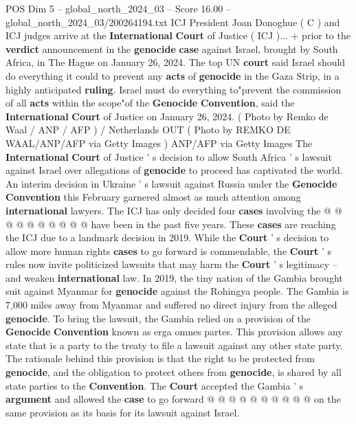 \begin{textsample}{POS Dim 5 – global\_north\_2024\_03 – Score 16.00 – global\_north\_2024\_03/200264194.txt}  \label{ex:f5_pos_362}
ICJ President Joan Donoghue ( C ) and ICJ judges arrive at the \textbf{International} \textbf{Court} of Justice ( ICJ )... + prior to the \textbf{verdict} announcement in the \textbf{genocide} \textbf{case} against Israel, brought by South Africa, in The Hague on January 26, 2024.
The top UN \textbf{court} said Israel should do everything it could to prevent any \textbf{acts} of \textbf{genocide} in the Gaza Strip, in a highly anticipated \textbf{ruling}.
Israel must do everything to"prevent the commission of all \textbf{acts} within the scope"of the \textbf{Genocide} \textbf{Convention}, said the \textbf{International} \textbf{Court} of Justice on January 26, 2024. ( Photo by Remko de Waal / ANP / AFP ) / Netherlands OUT ( Photo by REMKO DE WAAL/ANP/AFP via Getty Images ) ANP/AFP via Getty Images The \textbf{International} \textbf{Court} of Justice ' s decision to allow South Africa ' s lawsuit against Israel over allegations of \textbf{genocide} to proceed has captivated the world.
An interim decision in Ukraine ' s lawsuit against Russia under the \textbf{Genocide} \textbf{Convention} this February garnered almost as much attention among \textbf{international} lawyers.
The ICJ has only decided four \textbf{cases} involving the @ @ @ @ @ @ @ @ @ @ have been in the past five years.
These \textbf{cases} are reaching the ICJ due to a landmark decision in 2019.
While the \textbf{Court} ' s decision to allow more human rights \textbf{cases} to go forward is commendable, the \textbf{Court} ' s rules now invite politicized lawsuits that may harm the \textbf{Court} ' s legitimacy -- and weaken \textbf{international} law.
In 2019, the tiny nation of the Gambia brought suit against Myanmar for \textbf{genocide} against the Rohingya people.
The Gambia is 7,000 miles away from Myanmar and suffered no direct injury from the alleged \textbf{genocide}.
To bring the lawsuit, the Gambia relied on a provision of the \textbf{Genocide} \textbf{Convention} known as erga omnes partes.
This provision allows any state that is a party to the treaty to file a lawsuit against any other state party.
The rationale behind this provision is that the right to be protected from \textbf{genocide}, and the obligation to protect others from \textbf{genocide}, is shared by all state parties to the \textbf{Convention}.
The \textbf{Court} accepted the Gambia ' s \textbf{argument} and allowed the \textbf{case} to go forward @ @ @ @ @ @ @ @ @ @ on the same provision as its basis for its lawsuit against Israel.

\end{textsample}
